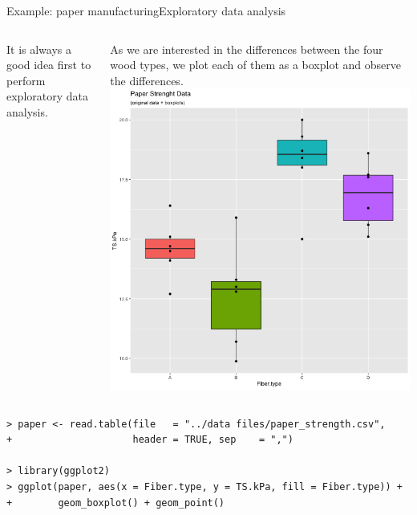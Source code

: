 \begin{frame}[fragile]{Example: paper manufacturing}{Exploratory data analysis}
\begin{columns}
  It is always a good idea first to perform exploratory data analysis.\medskip

  As we are interested in the differences between the four wood types, we plot each of them as a boxplot and observe the differences.
  \includegraphics[width=1\textwidth]{../img/paperboxplot.png}
\end{columns}

{\tiny
\begin{verbatim}
> paper <- read.table(file   = "../data files/paper_strength.csv",
+                     header = TRUE, sep    = ",")

> library(ggplot2)
> ggplot(paper, aes(x = Fiber.type, y = TS.kPa, fill = Fiber.type)) +
+        geom_boxplot() + geom_point()
\end{verbatim}}
\end{frame}




